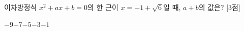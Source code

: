 이차방정식 $x^2+ax+b=0$의 한 근이 $x=-1+\sqrt{6}$일 때, $a+b$의 값은?  \mbox{[3점]}
\begin{choices32}{$-9$}{$-7$}{$-5$}{$-3$}{$-1$}\end{choices32}
